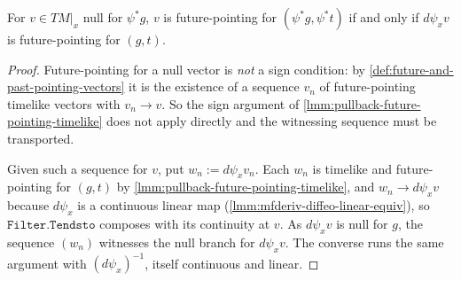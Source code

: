 \begin{lemma}
    \label{lmm:pullback-future-pointing-null}
    For $v \in TM|_x$ null for $\psi^*g$, $v$ is future-pointing for $(\psi^*g, \psi^*t)$ if and only if $d\psi_x v$ is future-pointing for $(g,t)$.
\end{lemma}
\begin{proof}
    Future-pointing for a null vector is \emph{not} a sign condition: by \ref{def:future-and-past-pointing-vectors} it is the existence of a sequence $v_n$ of future-pointing timelike vectors with $v_n \to v$. So the sign argument of \ref{lmm:pullback-future-pointing-timelike} does not apply directly and the witnessing sequence must be transported.

    Given such a sequence for $v$, put $w_n := d\psi_x v_n$. Each $w_n$ is timelike and future-pointing for $(g,t)$ by \ref{lmm:pullback-future-pointing-timelike}, and $w_n \to d\psi_x v$ because $d\psi_x$ is a continuous linear map (\ref{lmm:mfderiv-diffeo-linear-equiv}), so $\mathtt{Filter.Tendsto}$ composes with its continuity at $v$. As $d\psi_x v$ is null for $g$, the sequence $(w_n)$ witnesses the null branch for $d\psi_x v$. The converse runs the same argument with $(d\psi_x)^{-1}$, itself continuous and linear.
\end{proof}

